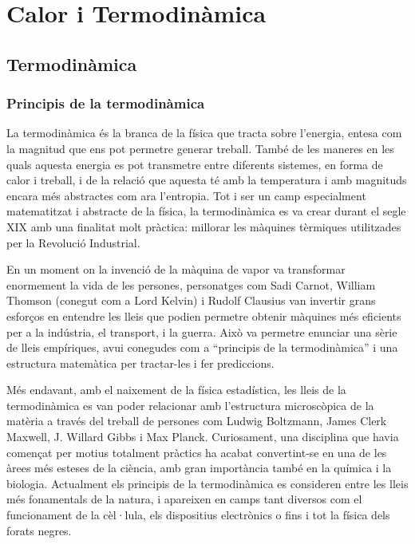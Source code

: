 \documentclass[12pt]{book}
\begin{document}
\part{Calor i Termodinàmica}

\chapter{Termodinàmica}
\label{chap:Termodinamica}

\section{Principis de la termodinàmica}

La termodinàmica és la branca de la física que tracta sobre l'energia, entesa com la magnitud que ens pot permetre generar treball. També de les maneres en les quals aquesta energia es pot transmetre entre diferents sistemes, en forma de calor i treball, i de la relació que aquesta té amb la temperatura i amb magnituds encara més abstractes com ara l'entropia. Tot i ser un camp especialment matematitzat i abstracte de la física, la termodinàmica es va crear durant el segle XIX amb una finalitat molt pràctica: millorar les màquines tèrmiques utilitzades per la Revolució Industrial. 

En un moment on la invenció de la màquina de vapor va transformar enormement la vida de les persones, personatges com Sadi Carnot, William Thomson (conegut com a Lord Kelvin) i Rudolf Clausius van invertir grans esforços en entendre les lleis que podien permetre obtenir màquines més eficients per a la indústria, el transport, i la guerra. Això va permetre enunciar una sèrie de lleis empíriques, avui conegudes com a ``principis de la termodinàmica'' i una estructura matemàtica per tractar-les i fer prediccions. 

Més endavant, amb el naixement de la física estadística, les lleis de la termodinàmica es van poder relacionar amb l'estructura microscòpica de la matèria a través del treball de persones com Ludwig Boltzmann, James Clerk Maxwell, J. Willard Gibbs i Max Planck. Curiosament, una disciplina que havia començat per motius totalment pràctics ha acabat convertint-se en una de les àrees més esteses de la ciència, amb gran importància també en la química i la biologia. Actualment els principis de la termodinàmica es consideren entre les lleis més fonamentals de la natura, i apareixen en camps tant diversos com el funcionament de la cèl·lula, els dispositius electrònics o fins i tot la física dels forats negres.
\end{document}

